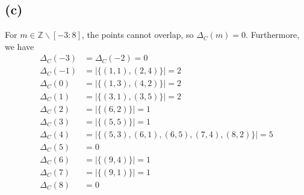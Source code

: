 \documentclass[12pt]{article}
\begin{document}
\subsection*{(c)}
For $m\in \mathbb{Z}\backslash\left[-3:8\right]$, the points cannot overlap, so $\Delta_{C}(m) = 0$. Furthermore, we have
\begin{align*}
\Delta_{C}(-3) &= \Delta_{C}(-2) = 0\\
\Delta_{C}(-1) &= |\lbrace (1,1),(2,4)\rbrace| = 2\\
\Delta_{C}(0) &= |\lbrace (1,3),(4,2)\rbrace| = 2\\
\Delta_{C}(1) &= |\lbrace (3,1),(3,5)\rbrace| = 2\\
\Delta_{C}(2) &= |\lbrace (6,2)\rbrace| = 1\\
\Delta_{C}(3) &= |\lbrace (5,5)\rbrace| = 1\\
\Delta_{C}(4) &= |\lbrace (5,3),(6,1),(6,5),(7,4),(8,2)\rbrace| = 5\\
\Delta_{C}(5) &= 0\\
\Delta_{C}(6) &= |\lbrace (9,4)\rbrace| = 1\\
\Delta_{C}(7) &= |\lbrace (9,1) \rbrace| = 1\\
\Delta_{C}(8) &= 0
\end{align*}
\end{document}
